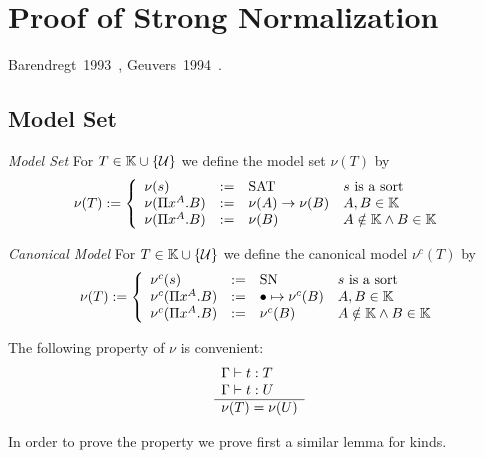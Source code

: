 \section{Proof of Strong Normalization}

Barendregt~1993~\cite{barendregt1993}, Geuvers~1994~\cite{geuvers1994}.




\subsection{Model Set}

\begin{definition}
    \emph{Model Set} For $T \in \mathbb{K} \cup {\{{\cal U}\}}$ we define the model set
    $\nu(T)$ by
    $$
        \nu(T) :=
        \left \{
        \begin{array}{llll}
            \nu(s) &:=& \text{SAT} & s \text{ is a sort}
            \\
            \nu(\Pi x^A. B) &:=& \nu(A)\to \nu(B) & A,B \in \mathbb{K}
            \\
            \nu(\Pi x^A. B) &:=& \nu(B) & A \notin \mathbb{K} \land B \in \mathbb{K}
        \end{array}
        \right.
    $$
\end{definition}



\begin{definition}
    \emph{Canonical Model} For $T \in \mathbb{K} \cup {\{{\cal U}\}}$ we define the
    canonical model $\nu^c(T)$ by
    $$
        \nu(T) :=
        \left \{
        \begin{array}{llll}
            \nu^c(s) &:=& \text{SN} & s \text{ is a sort}
            \\
            \nu^c(\Pi x^A. B)
            &:=&
            \bullet \mapsto \nu^c(B) & A,B \in \mathbb{K}
            \\
            \nu^c(\Pi x^A. B)
            &:=&
            \nu^c(B) & A \notin \mathbb{K} \land B \in \mathbb{K}
        \end{array}
        \right.
    $$
\end{definition}


The following property of $\nu$ is convenient:
$$
    \begin{array}{l} 
        \Gamma \vdash t: T
        \\
        \Gamma \vdash t: U
     \\ \hline 
        \nu(T) = \nu(U)
    \end{array}
$$


In order to prove the property we prove first a similar lemma for kinds.

